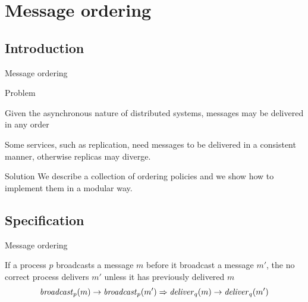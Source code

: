 
\section{Message ordering}

\subsection{Introduction}

\begin{frame}{Message ordering}

\begin{block}{Problem}
\BI
\item Given the asynchronous nature of distributed systems, messages may be delivered	
in any order
\item Some services, such as replication, need messages to be delivered in a
consistent manner, otherwise replicas may diverge.
\EI
\end{block}

\bigskip
\begin{block}{Solution}
We describe a collection of ordering policies and we show how to 
implement them in a modular way.
\end{block}

\end{frame}

\subsection{Specification}

\begin{frame}{Message ordering}

\begin{definition}
If a process $p$ broadcasts a message $m$ before it broadcast a message $m'$, the 
no correct process delivers $m'$ unless it has previously delivered $m$
\[
  \mathit{broadcast}_p(m) \rightarrow \mathit{broadcast}_p(m') \Rightarrow \mathit{deliver}_q(m) \rightarrow \mathit{deliver}_q(m')
\]
\end{definition}
		
\end{frame}


